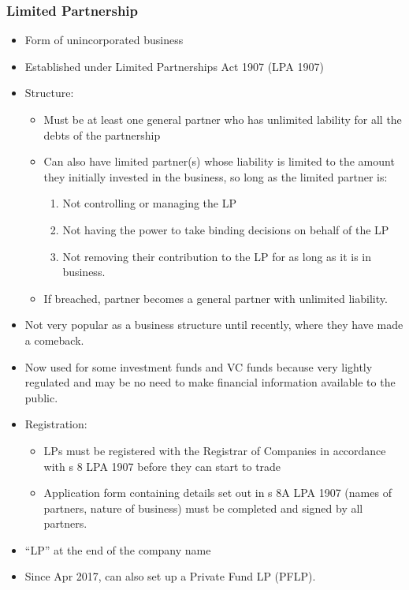 \documentclass[
]{article}
\providecommand{\tightlist}{%
  \setlength{\itemsep}{0pt}\setlength{\parskip}{0pt}}
\begin{document}
\hypertarget{limited-partnership}{%
\subsubsection{Limited Partnership}\label{limited-partnership}}

\begin{itemize}
\tightlist
\item
  Form of unincorporated business
\item
  Established under Limited Partnerships Act 1907 (LPA 1907)
\item
  Structure:

  \begin{itemize}
  \tightlist
  \item
    Must be at least one general partner who has unlimited lability for
    all the debts of the partnership
  \item
    Can also have limited partner(s) whose liability is limited to the
    amount they initially invested in the business, so long as the
    limited partner is:

    \begin{enumerate}
    \tightlist
    \item
      Not controlling or managing the LP
    \item
      Not having the power to take binding decisions on behalf of the LP
    \item
      Not removing their contribution to the LP for as long as it is in
      business.
    \end{enumerate}
  \item
    If breached, partner becomes a general partner with unlimited
    liability.
  \end{itemize}
\item
  Not very popular as a business structure until recently, where they
  have made a comeback.
\item
  Now used for some investment funds and VC funds because very lightly
  regulated and may be no need to make financial information available
  to the public.
\item
  Registration:

  \begin{itemize}
  \tightlist
  \item
    LPs must be registered with the Registrar of Companies in accordance
    with s 8 LPA 1907 before they can start to trade
  \item
    Application form containing details set out in s 8A LPA 1907 (names
    of partners, nature of business) must be completed and signed by all
    partners.
  \end{itemize}
\item
  ``LP'' at the end of the company name
\item
  Since Apr 2017, can also set up a Private Fund LP (PFLP).


\end{itemize}
\end{document}
